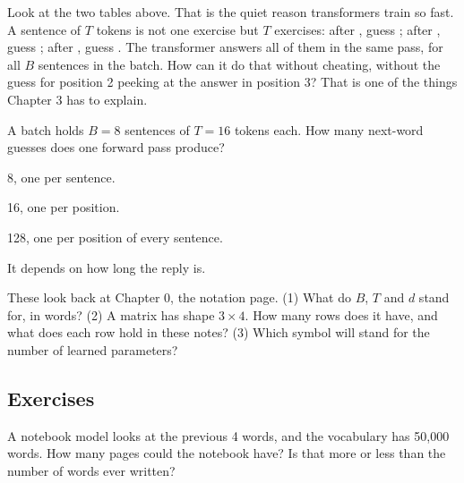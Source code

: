 \begin{center}\end{center}

Look at the two tables above. That is the quiet reason transformers train so fast. A sentence of $T$ tokens is not one exercise
but $T$ exercises: after , guess ; after , guess ; after , guess . The transformer answers all of them in the same pass, for all $B$ sentences in the
batch. How can it do that without cheating, without the guess for position 2 peeking at the answer in position
3? That is one of the things Chapter 3 has to explain.

\begin{checkq}
A batch holds $B=8$ sentences of $T=16$ tokens each. How many next-word guesses does one forward pass produce?
\begin{options}
\item 8, one per sentence.
\item 16, one per position.
\item 128, one per position of every sentence.
\item It depends on how long the reply is.
\end{options}
\end{checkq}


\begin{lookingback}
These look back at Chapter 0, the notation page.
(1) What do $B$, $T$ and $d$ stand for, in words? (2) A matrix has shape $3\times4$. How many rows does it have,
and what does each row hold in these notes? (3) Which symbol will stand for the number of learned parameters?
\end{lookingback}

\subsection*{Exercises}

\begin{exercise}
A notebook model looks at the previous 4 words, and the vocabulary has 50{,}000 words. How many pages could the
notebook have? Is that more or less than the number of words ever written?
\end{exercise}


